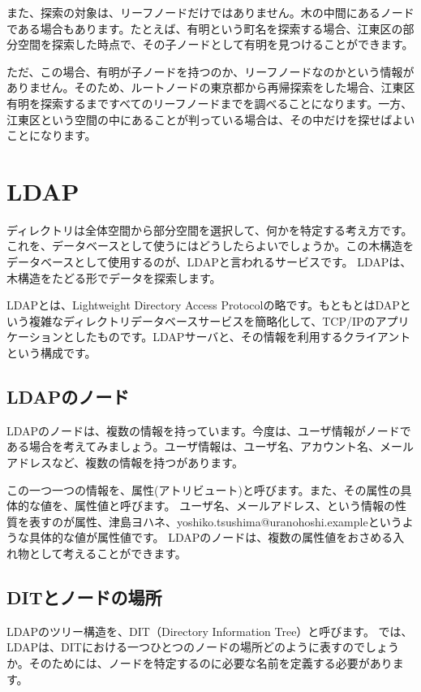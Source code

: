 また、探索の対象は、リーフノードだけではありません。木の中間にあるノードである場合もあります。たとえば、有明という町名を探索する場合、江東区の部分空間を探索した時点で、その子ノードとして有明を見つけることができます。

ただ、この場合、有明が子ノードを持つのか、リーフノードなのかという情報がありません。そのため、ルートノードの東京都から再帰探索をした場合、江東区有明を探索するまですべてのリーフノードまでを調べることになります。一方、江東区という空間の中にあることが判っている場合は、その中だけを探せばよいことになります。

\section{LDAP}

ディレクトリは全体空間から部分空間を選択して、何かを特定する考え方です。これを、データベースとして使うにはどうしたらよいでしょうか。この木構造をデータベースとして使用するのが、LDAPと言われるサービスです。
LDAPは、木構造をたどる形でデータを探索します。

LDAPとは、Lightweight Directory Access Protocolの略です。もともとはDAPという複雑なディレクトリデータベースサービスを簡略化して、TCP/IPのアプリケーションとしたものです。LDAPサーバと、その情報を利用するクライアントという構成です。

\subsection{LDAPのノード}

LDAPのノードは、複数の情報を持っています。今度は、ユーザ情報がノードである場合を考えてみましょう。ユーザ情報は、ユーザ名、アカウント名、メールアドレスなど、複数の情報を持つがあります。

この一つ一つの情報を、属性(アトリビュート)と呼びます。また、その属性の具体的な値を、属性値と呼びます。
ユーザ名、メールアドレス、という情報の性質を表すのが属性、津島ヨハネ、yoshiko.tsushima@uranohoshi.exampleというような具体的な値が属性値です。
LDAPのノードは、複数の属性値をおさめる入れ物として考えることができます。


\subsection{DITとノードの場所}

LDAPのツリー構造を、DIT（Directory Information Tree）と呼びます。
では、LDAPは、DITにおける一つひとつのノードの場所どのように表すのでしょうか。そのためには、ノードを特定するのに必要な名前を定義する必要があります。


